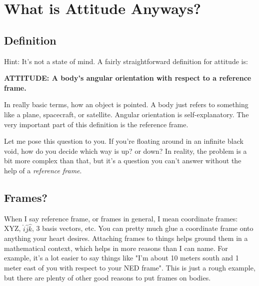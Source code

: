 \documentclass[a4paper,14pt]{extreport}
\begin{document}
\chapter{What is Attitude Anyways?}

\section{Definition}
Hint: It's not a state of mind. A fairly straightforward definition for attitude is:

\begin{center}
\textbf{ATTITUDE: A body's angular orientation with respect to a reference frame.}
\end{center}

In really basic terms, how an object is pointed. A body just refers to something like a plane, spacecraft, or satellite. Angular orientation is self-explanatory. The very important part of this definition is the reference frame. 

Let me pose this question to you. If you're floating around in an infinite black void, how do you decide which way is up? or down? In reality, the problem is a bit more complex than that, but it's a question you can't answer without the help of a \textit{reference frame}.

\section{Frames?}

When I say reference frame, or frames in general, I mean coordinate frames: XYZ, \(\hat{i}\hat{j}\hat{k}\), 3 basis vectors, etc. You can pretty much glue a coordinate frame onto anything your heart desires. Attaching frames to things helps ground them in a mathematical context, which helps in more reasons than I can name. For example, it's a lot easier to say things like "I'm about 10 meters south and 1 meter east of you with respect to your NED frame". This is just a rough example, but there are plenty of other good reasons to put frames on bodies.
\end{document}
